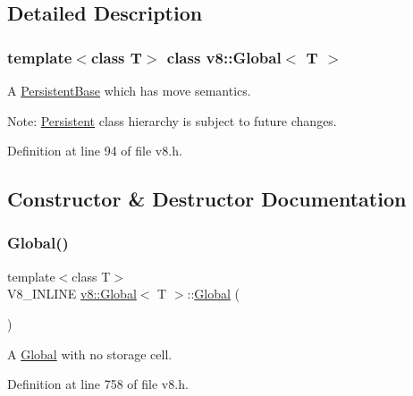 \subsection{Detailed Description}
\subsubsection*{template$<$class T$>$\newline
class v8\+::\+Global$<$ T $>$}

A \mbox{\hyperlink{classv8_1_1PersistentBase}{Persistent\+Base}} which has move semantics.

Note\+: \mbox{\hyperlink{classv8_1_1Persistent}{Persistent}} class hierarchy is subject to future changes. 

Definition at line 94 of file v8.\+h.



\subsection{Constructor \& Destructor Documentation}
\mbox{\label{classv8_1_1Global_ab1efdf25ff6305e67f3266a6fe90527e}} 
\subsubsection{\texorpdfstring{Global()}{Global()}\hspace{0.1cm}{\footnotesize\ttfamily [1/4]}}
{\footnotesize\ttfamily template$<$class T$>$ \\
V8\+\_\+\+I\+N\+L\+I\+NE \mbox{\hyperlink{classv8_1_1Global}{v8\+::\+Global}}$<$ T $>$\+::\mbox{\hyperlink{classv8_1_1Global}{Global}} (\begin{DoxyParamCaption}{ }\end{DoxyParamCaption})\hspace{0.3cm}{\ttfamily [inline]}}

A \mbox{\hyperlink{classv8_1_1Global}{Global}} with no storage cell. 

Definition at line 758 of file v8.\+h.

\mbox{\label{classv8_1_1Global_a8434bb6729eb4cd0cd85ad81bd8344ad}} 
